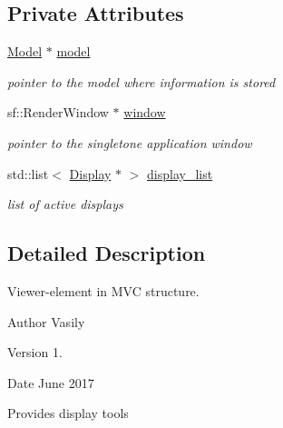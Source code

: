 \subsection*{Private Attributes}
\begin{DoxyCompactItemize}
\item 
\mbox{\label{class_viewer_a974fa8b6e46d1e09e334da06b769ab6b}} 
\hyperlink{class_model}{Model} $\ast$ \hyperlink{class_viewer_a974fa8b6e46d1e09e334da06b769ab6b}{model}
\begin{DoxyCompactList}\small\item\em pointer to the model where information is stored \end{DoxyCompactList}\item 
\mbox{\label{class_viewer_ae144a159f8ffcfd94e355cdab921b8d3}} 
sf\+::\+Render\+Window $\ast$ \hyperlink{class_viewer_ae144a159f8ffcfd94e355cdab921b8d3}{window}
\begin{DoxyCompactList}\small\item\em pointer to the singletone application window \end{DoxyCompactList}\item 
\mbox{\label{class_viewer_a3f38d8aec27298408b8e5856a7ef2995}} 
std\+::list$<$ \hyperlink{class_display}{Display} $\ast$ $>$ \hyperlink{class_viewer_a3f38d8aec27298408b8e5856a7ef2995}{display\+\_\+list}
\begin{DoxyCompactList}\small\item\em list of active displays \end{DoxyCompactList}\end{DoxyCompactItemize}


\subsection{Detailed Description}
Viewer-\/element in M\+VC structure. 

\begin{DoxyAuthor}{Author}
Vasily 
\end{DoxyAuthor}
\begin{DoxyVersion}{Version}
1. 
\end{DoxyVersion}
\begin{DoxyDate}{Date}
June 2017
\end{DoxyDate}
Provides display tools 

